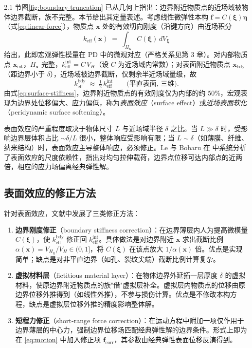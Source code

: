 2.1 节图\ref{fig:boundary-truncation} 已从几何上指出：边界附近物质点的近场域被物体边界截断，族不完整。本节给出其定量表述。考虑线性微弹性本构 $\mathbf{f}=C(\boldsymbol{\xi})\boldsymbol{\eta}$（式\eqref{eq:linear-force}），物质点 $\mathbf{x}$ 处的有效切向刚度（沿键方向）由近场积分
\begin{equation}
  \label{eq:effective-stiffness}
  k_{\text{eff}}(\mathbf{x}) \;=\; \int_{H_{\mathbf{x}}} C(\boldsymbol{\xi})\, dV_{\boldsymbol{\xi}}
\end{equation}
给出，此即宏观弹性模量在 PD 中的微观对应（严格关系见第 3 章）。对内部物质点 $\mathbf{x}_{\text{int}}$，$H_{\mathbf{x}}$ 完整，$k_{\text{eff}}^{\text{int}} = C\,V_H$（设 $C$ 为近场域内常数）；对表面附近物质点 $\mathbf{x}_{\text{bdy}}$（距边界小于 $\delta$），近场域被边界截断，仅剩余半近场域量级，故
\begin{equation}
  \label{eq:surface-stiffness}
  k_{\text{eff}}^{\text{bdy}} \;\approx\; \tfrac{1}{2}\, k_{\text{eff}}^{\text{int}} \qquad \text{(平直表面, 三维)}.
\end{equation}
由式\eqref{eq:surface-stiffness}，边界附近物质点的有效刚度仅为内部的约 $50\%$，宏观表现为边界处位移偏大、应力偏低，称为\emph{表面效应}（surface effect）或\emph{近场表面软化}（peridynamic surface softening）。

表面效应的严重程度取决于物体尺寸 $L$ 与近场域半径 $\delta$ 之比。当 $L\gg\delta$ 时，受影响边界层体积占比 $\sim\delta/L$ 很小，整体响应受影响有限；当 $L\sim\delta$（如薄膜、纤维、纳米结构）时，表面效应主导整体响应，必须修正。Le 与 Bobaru 在 \cite{LeBobaru2018} 中系统分析了表面效应的尺度依赖性，指出对均匀拉伸载荷，边界点位移可达内部点的近两倍，相应的应力场偏离经典弹性解。

\subsection{表面效应的修正方法}

针对表面效应，文献中发展了三类修正方法：

\begin{enumerate}
  \item \textbf{边界刚度修正}（boundary stiffness correction）：在边界薄层内人为提高微模量 $C(\boldsymbol{\xi})$，使 $k_{\text{eff}}^{\text{bdy}}$ 修正回 $k_{\text{eff}}^{\text{int}}$。具体做法是对边界附近 $\mathbf{x}$ 求出截断比例 $\alpha(\mathbf{x}) = V_{H_{\mathbf{x}}}/V_H\in(0,1]$，将 $C(\boldsymbol{\xi})$ 在该点放大 $1/\alpha(\mathbf{x})$ 倍。优点是实现简单；缺点是对非平直边界（如孔、裂纹尖端）截断比例计算复杂。
  
  \item \textbf{虚拟材料层}（fictitious material layer）：在物体边界外延拓一层厚度 $\delta$ 的虚拟材料，使原边界附近物质点的族"借"虚拟层补全。虚拟层内物质点的位移由原边界位移外推得到（如线性外推），不参与损伤计算。优点是不修改本构方程，缺点是虚拟层位移外推的精度影响整体解。
  
  \item \textbf{短程力修正}（short-range force correction）：在运动方程中附加一项仅作用于边界薄层的中心力，强制边界位移场匹配经典弹性解的边界条件。形式上即为在 \eqref{eq:motion} 中加入修正项 $\mathbf{f}_{\text{corr}}$，其参数由经典弹性表面位移反演得到。
\end{enumerate}

